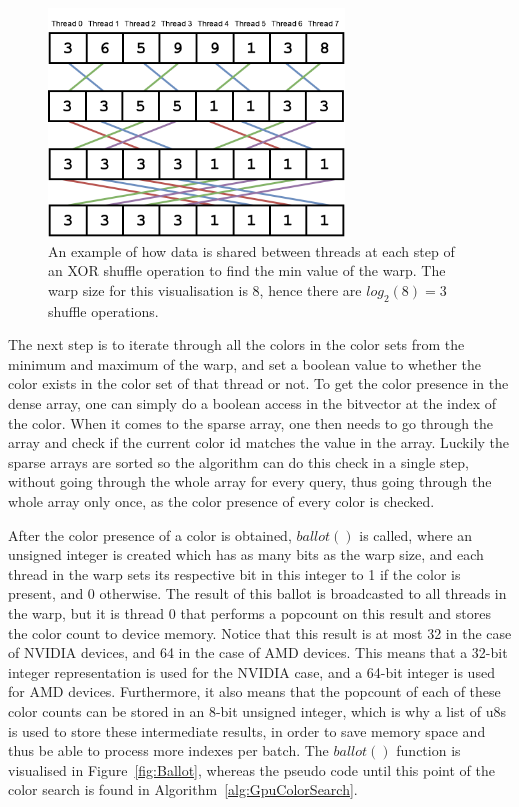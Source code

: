 \begin{figure}[t]
  \centering
  \includegraphics[width=0.7\textwidth]{images/ShuffleXor.png}
  \caption{An example of how data is shared between threads at each step of an XOR shuffle operation to find the min value of the warp. The warp size for this visualisation is 8, hence there are $log_2(8) = 3$ shuffle operations.}\label{fig:ShuffleXor}
\end{figure}

The next step is to iterate through all the colors in the color sets from the minimum and maximum of the warp, and set a boolean value to whether the color exists in the color set of that thread or not.
To get the color presence in the dense array, one can simply do a boolean access in the bitvector at the index of the color.
When it comes to the sparse array, one then needs to go through the array and check if the current color id matches the value in the array.
Luckily the sparse arrays are sorted so the algorithm can do this check in a single step, without going through the whole array for every query, thus going through the whole array only once, as the color presence of every color is checked.

After the color presence of a color is obtained, $\mathit{ballot()}$ is called, where an unsigned integer is created which has as many bits as the warp size, and each thread in the warp sets its respective bit in this integer to 1 if the color is present, and 0 otherwise.
The result of this ballot is broadcasted to all threads in the warp, but it is thread 0 that performs a popcount on this result and stores the color count to device memory.
Notice that this result is at most 32 in the case of NVIDIA devices, and 64 in the case of AMD devices.
This means that a 32-bit integer representation is used for the NVIDIA case, and a 64-bit integer is used for AMD devices.
Furthermore, it also means that the popcount of each of these color counts can be stored in an 8-bit unsigned integer, which is why a list of u8s is used to store these intermediate results, in order to save memory space and thus be able to process more indexes per batch.
The $\mathit{ballot()}$ function is visualised in Figure~\ref{fig:Ballot}, whereas the pseudo code until this point of the color search is found in Algorithm~\ref{alg:GpuColorSearch}.

